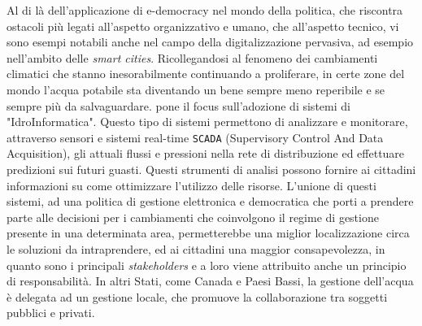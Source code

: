 \documentclass[12pt,a4paper,openright,twoside]{book}
\begin{document}
Al di là dell'applicazione di e-democracy nel mondo della politica, che riscontra
ostacoli più legati all'aspetto organizzativo e umano, che all'aspetto tecnico,
vi sono esempi notabili anche nel campo della digitalizzazione pervasiva, ad esempio nell'ambito delle \textit{smart cities}.
Ricollegandosi al fenomeno dei cambiamenti climatici che stanno inesorabilmente continuando a proliferare,
in certe zone del mondo l'acqua potabile sta diventando un bene sempre meno reperibile e se sempre più da salvaguardare.
\cite{smartwater} pone il focus sull'adozione di sistemi di "IdroInformatica". Questo tipo di sistemi permettono di analizzare 
e monitorare, attraverso sensori e sistemi real-time \texttt{SCADA} (Supervisory Control And Data Acquisition), gli attuali flussi e pressioni nella
rete di distribuzione ed effettuare predizioni sui futuri guasti. Questi strumenti di analisi possono fornire ai cittadini
informazioni su come ottimizzare l'utilizzo delle risorse. L'unione di questi sistemi, ad una politica di gestione elettronica e democratica
che porti a prendere parte alle decisioni per i cambiamenti che coinvolgono il regime di gestione presente in una determinata area,
permetterebbe una miglior localizzazione circa le soluzioni da intraprendere, ed ai cittadini una maggior consapevolezza, in quanto sono i principali \textit{stakeholders} 
e a loro viene attribuito anche un principio di responsabilità.
In altri Stati, come Canada e Paesi Bassi, la gestione dell'acqua è delegata ad un gestione locale, che promuove la collaborazione tra soggetti pubblici e privati.
\end{document}
